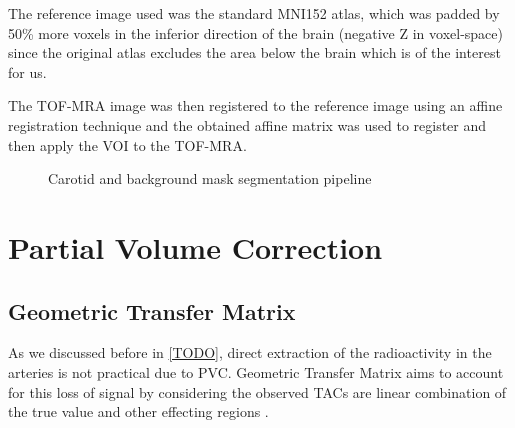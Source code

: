 The reference image used was the standard MNI152 atlas, which was padded by 50\% more voxels in the inferior direction of the brain (negative Z in voxel-space) since the original atlas excludes the area below the brain which is of the interest for us.

The TOF-MRA image was then registered to the reference image using an affine registration technique and the obtained affine matrix was used to register and then apply the VOI to the TOF-MRA.

\begin{figure}[h]
	\centering
	\caption{Carotid and background mask segmentation pipeline}
	\label{fig:seg_pipeline}
\end{figure}

\section{Partial Volume Correction}
\subsection{Geometric Transfer Matrix}
As we discussed before in \ref{TODO}, direct extraction of the radioactivity in the arteries is not practical due to PVC.
Geometric Transfer Matrix aims to account for this loss of signal by considering the observed TACs are linear combination of the true value and other effecting regions \cite{rousset1998correction}.


